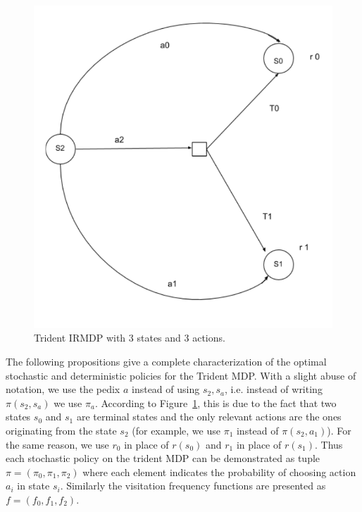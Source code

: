 \begin{figure}
	\begin{center}
    \includegraphics[scale=0.4]{images/Trident_MDP.pdf}
	\end{center}
	\caption{Trident IRMDP with $3$ states and $3$ actions.}
	\label{fig:trident} 
\end{figure}



The following propositions give a complete characterization of the optimal stochastic and deterministic policies for the Trident MDP. With a slight abuse of notation, we use the pedix $a$ instead of using $s_2,s_a$, i.e. instead of writing $\pi(s_2, s_a)$ we use $\pi_a$. According to Figure~\ref{fig:trident}, this is due to the fact that two states $s_0$ and $s_1$ are terminal states and the only relevant actions are the ones originating from the state $s_2$ (for example, we use $\pi_1$ instead of $\pi(s_2, a_1)$). For the same reason, we use $r_{0}$ in place of $r(s_0)$ and $r_{1}$ in place of $r(s_1)$. Thus each stochastic policy on the trident MDP can be demonstrated as tuple $\pi = (\pi_0, \pi_1, \pi_2)$ where each element indicates the probability of choosing action $a_i$ in state $s_i$. Similarly the visitation frequency functions are presented as $f = (f_0, f_1, f_2)$.

